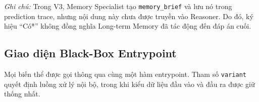 \begin{table}[H]
\centering
\caption{So sánh các thành phần được sử dụng trong V0--V4.}
\label{tab:variants}


\vspace{2mm}

\begin{minipage}{0.96\textwidth}
\footnotesize
\textit{Ghi chú:} Trong V3, Memory Specialist tạo
\texttt{memory\_brief} và lưu nó trong prediction trace, nhưng nội
dung này chưa được truyền vào Reasoner. Do đó, ký hiệu ``Có*''
không đồng nghĩa Long-term Memory đã tác động đến đáp án cuối.
\end{minipage}

\end{table}

\FloatBarrier


\subsection{Giao diện Black-Box Entrypoint}

Mọi biến thể được gọi thông qua cùng một hàm entrypoint. Tham số
\texttt{variant} quyết định luồng xử lý nội bộ, trong khi kiểu dữ
liệu đầu vào và đầu ra được giữ thống nhất.

